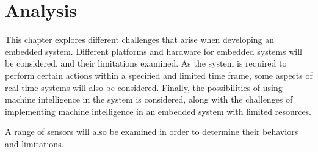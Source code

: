 \chapter{Analysis}\label{ch:analysis}\label{\automlabel}
This chapter explores different challenges that arise when developing an embedded system. Different platforms and hardware for embedded systems will be considered, and their limitations examined. As the system is required to perform certain actions within a specified and limited time frame, some aspects of real-time systems will also be considered. Finally, the possibilities of using machine intelligence in the system is considered, along with the challenges of implementing machine intelligence in an embedded system with limited resources.

\noindent
A range of sensors will also be examined in order to determine their behaviors and limitations. 
\eal